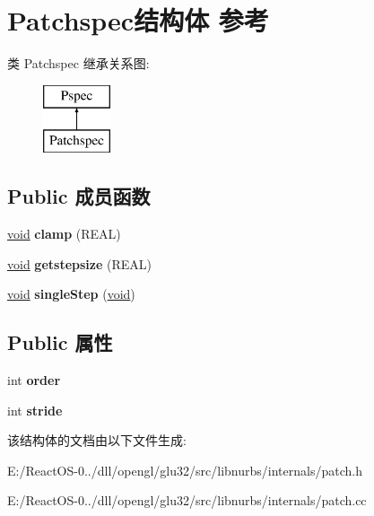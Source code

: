\hypertarget{struct_patchspec}{}\section{Patchspec结构体 参考}
\label{struct_patchspec}
类 Patchspec 继承关系图\+:\begin{figure}[H]
\begin{center}
\leavevmode
\includegraphics[height=2.000000cm]{struct_patchspec}
\end{center}
\end{figure}
\subsection*{Public 成员函数}
\begin{DoxyCompactItemize}
\item 
\mbox{\label{struct_patchspec_a5790aa01ccfe0bb72647dbe88d0c0008}} 
\hyperlink{interfacevoid}{void} {\bfseries clamp} (R\+E\+AL)
\item 
\mbox{\label{struct_patchspec_a3be367d633866b6069e1d14331088666}} 
\hyperlink{interfacevoid}{void} {\bfseries getstepsize} (R\+E\+AL)
\item 
\mbox{\label{struct_patchspec_aca5f84f21d4fe040053c20f8a22d3232}} 
\hyperlink{interfacevoid}{void} {\bfseries single\+Step} (\hyperlink{interfacevoid}{void})
\end{DoxyCompactItemize}
\subsection*{Public 属性}
\begin{DoxyCompactItemize}
\item 
\mbox{\label{struct_patchspec_adc412841732cff4dbf7a9a965a2736dc}} 
int {\bfseries order}
\item 
\mbox{\label{struct_patchspec_a61b4e1ee88c5194e7d6c40664eea968d}} 
int {\bfseries stride}
\end{DoxyCompactItemize}


该结构体的文档由以下文件生成\+:\begin{DoxyCompactItemize}
\item 
E\+:/\+React\+O\+S-\/0../dll/opengl/glu32/src/libnurbs/internals/patch.\+h\item 
E\+:/\+React\+O\+S-\/0../dll/opengl/glu32/src/libnurbs/internals/patch.\+cc\end{DoxyCompactItemize}
